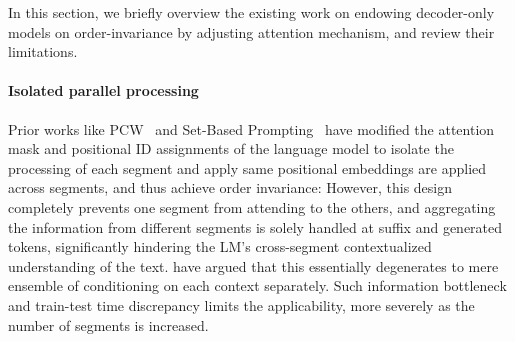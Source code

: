 In this section, we briefly overview the existing work on endowing decoder-only models on order-invariance by adjusting attention mechanism, and review their limitations.

\paragraph{Isolated parallel processing}
Prior works like PCW~\citep{pcw} and Set-Based Prompting~\cite{setbasedprompting} have modified the attention mask and positional ID assignments of the language model to isolate the processing of each segment and apply same positional embeddings are applied across segments, and thus achieve order invariance:
However, this design completely prevents one segment from attending to the others, and aggregating the information from different segments is solely handled at suffix and generated tokens, significantly hindering the LM's cross-segment contextualized understanding of the text. %
\citet{yang2023revisitingparallelcontextwindows} have argued that this essentially degenerates to mere ensemble of conditioning on each context separately.
Such information bottleneck and train-test time discrepancy limits the applicability, more severely as the number of segments is increased. 

